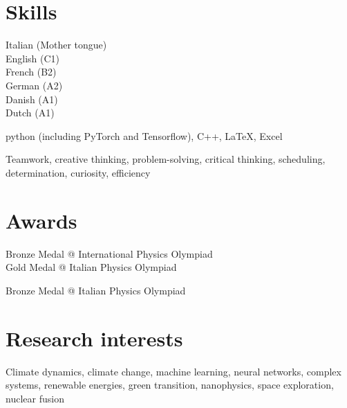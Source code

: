 \documentclass[11pt, a4 paper]{article}
\begin{document}


\section*{Skills}
  \begin{description}[style=multiline,leftmargin=3cm,align=right]
    \item[Languages]
      Italian (Mother tongue) \\
      English (C1) \\
      French (B2) \\
      German (A2) \\
      Danish (A1) \\
      Dutch (A1)
    \item[Software]
      python (including PyTorch and Tensorflow), C++, LaTeX, Excel
    \item[Transversal]
      Teamwork, creative thinking, problem-solving, critical thinking, scheduling, determination, curiosity, efficiency
  \end{description}


\section*{Awards}
  \begin{description}[style=multiline,leftmargin=3cm,align=right]
    \item[2016]
      Bronze Medal @ International Physics Olympiad \\
      Gold Medal @ Italian Physics Olympiad
    \item[2015] Bronze Medal @ Italian Physics Olympiad
  \end{description}


\section*{Research interests}
  \begin{description}[style=multiline,leftmargin=3cm,align=right]
    \item[] Climate dynamics, climate change, machine learning, neural networks, complex systems, renewable energies, green transition, nanophysics, space exploration, nuclear fusion
  \end{description}
\end{document}
